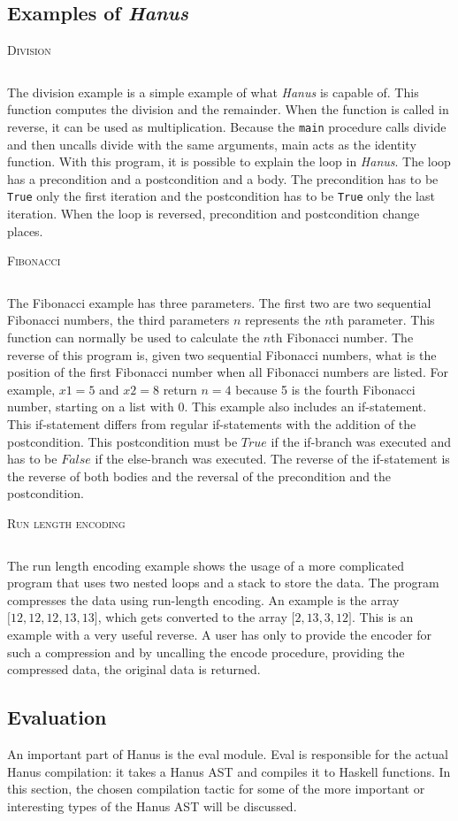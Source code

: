 \documentclass[12pt,a4paper]{article}
\newcommand{\inlinecode}[1]{\texttt{#1}}
\newcommand{\code}[2]{
 \begin{center} \textsc{\small #1} \end{center}
 \inputminted[frame=lines,framesep=.5cm,baselinestretch=.8,linenos,fontsize=\footnotesize]
         {haskell}{code/#2.hs}
}
\begin{document}
\subsection{Examples of \textit{Hanus}}
\code{Division}{divide}
The division example is a simple example of what \textit{Hanus} is capable of. This function computes the division and the remainder. When the function is called in reverse, it can be used as multiplication. Because the \inlinecode{main} procedure calls divide and then uncalls divide with the same arguments, main acts as the identity function. With this program, it is possible to explain the loop in \textit{Hanus}. The loop has a precondition and a postcondition and a body. The precondition has to be \inlinecode{True} only the first iteration and the postcondition has to be \inlinecode{True} only the last iteration. When the loop is reversed, precondition and postcondition change places. 

\newpage    
\code{Fibonacci}{fibonacci}
The Fibonacci example has three parameters. The first two are two sequential Fibonacci numbers, the third parameters $n$ represents the $n$th parameter. This function can normally be used to calculate the $n$th Fibonacci number. The reverse of this program is, given two sequential Fibonacci numbers, what is the position of the first Fibonacci number when all Fibonacci numbers are listed. For example, $x1 = 5$ and $x2 = 8$ return $n=4$ because 5 is the fourth Fibonacci number, starting on a list with 0. This example also includes an if-statement. This if-statement differs from regular if-statements with the addition of the postcondition. This postcondition must be $True$ if the if-branch was executed and has to be $False$ if the else-branch was executed. The reverse of the if-statement is the reverse of both bodies and the reversal of the precondition and the postcondition.
\code{Run length encoding}{run-length-encoding}
The run length encoding example shows the usage of a more complicated program that uses two nested loops and a stack to store the data. The program compresses the data using run-length encoding. An example is the array $\lbrack 12, 12, 12, 13, 13 \rbrack$, which gets converted to the array $\lbrack 2, 13, 3, 12 \rbrack$. This is an example with a very useful reverse. A user has only to provide the encoder for such a compression and by uncalling the encode procedure, providing the compressed data, the original data is returned.

    \subsection{Evaluation}
        \label{sec-eval}
            An important part of Hanus is the eval module. Eval is responsible for the actual Hanus compilation: it takes a Hanus AST and compiles it to Haskell functions. In this section, the chosen compilation tactic for some of the more important or interesting types of the Hanus AST will be discussed.
\end{document}
